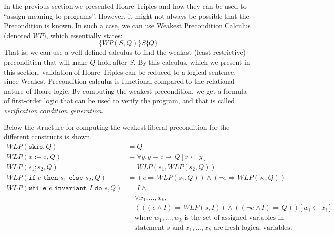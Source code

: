 

In the previous section we presented Hoare Triples and how they can be used to ``assign meaning to programs''. However, it might not always be possible that the Precondition is known. In such a case, we can use Weakest Precondition Calculus (denoted $WP$), which essentially states:
$$
 \{WP(S,Q)\}S\{Q\}
$$
That is, we can use a well-defined calculus to find the weakest (least restrictive) precondition that will make $Q$ hold after $S$. By this calculus, which we present in this section, validation of Hoare Triples can be reduced to a logical sentence, since Weakest Precondition calculus is functional compared to the relational nature of Hoare logic.
By computing the weakest precondition, we get a formula of first-order logic that can be used to verify the program, and that is called \textit{verification condition generation}.

Below the structure for computing the weakest liberal precondition for the different constructs is shown.
\begin{align*}
	WLP(\texttt{skip}, Q) &= Q \\
	WLP(x:=e,Q) &= \forall y, y = e \Rightarrow Q[x \leftarrow y] \\
	WLP(s_1;s_2, Q) &= WLP(s_1, WLP(s_2, Q)) \\
	WLP(\texttt{if } e \texttt{ then } s_1 \texttt{ else } s_2, Q) &= (e \Rightarrow WLP(s_1, Q)) \land (\neg e \Rightarrow WLP(s_2, Q)) \\
	WLP(\texttt{while } e \texttt{ invariant } I \texttt{ do } s, Q) &= 
		I \land \\
    &\quad \forall x_1, ..., x_k, \\
    &\quad (((e \land I) \Rightarrow WLP(s, I)) \land (( \neg e \land I) \Rightarrow Q))
       [w_i \leftarrow x_i] \\
	&\quad \text{where } w_1, ..., w_k \text{ is the set of assigned variables in} \\
  &\quad \text{statement } s \text{ and } x_1, ..., x_k \text{ are fresh logical variables.}
\end{align*}


